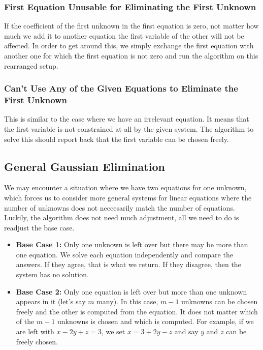\documentclass{article}
\begin{document}
	\subsubsection{First Equation Unusable for Eliminating the First Unknown}
	If the coefficient of the first unknown in the first equation is zero, not matter how much we add it to another equation the first variable of the other will not be affected. In order to get around this, we simply exchange the first equation with another one for which the first equation is not zero and run the algorithm on this rearranged setup.
	
	\subsubsection{Can't Use Any of the Given Equations to Eliminate the First Unknown}
	This is similar to the case where we have an irrelevant equation. It means that the first variable is not constrained at all by the given system. The algorithm to solve this should report back that the first variable can be chosen freely.
	
	\subsection{General Gaussian Elimination}
	We may encounter a situation where we have two equations for one unknown, which forces us to consider more general systems for linear equations where the number of unknowns does not neccesarily match the number of equations. Luckily, the algorithm does not need much adjustment, all we need to do is readjust the base case.
	
	\begin{itemize}
		\item \textbf{Base Case 1:} Only one unknown is left over but there may be more than one equation. We solve each equation independently and compare the answers. If they agree, that is what we return. If they disagree, then the system has no solution.
		\item \textbf{Base Case 2:} Only one equation is left over but more than one unknown appears in it (let's say $m$ many). In this case, $m - 1$ unknowns can be chosen freely and the other is computed from the equation. It does not matter which of the $m - 1$ unknowns is chosen and which is computed. For example, if we are left with $x - 2y + z = 3$, we set $x = 3 + 2y - z$ and say $y$ and $z$ can be freely chosen.
	\end{itemize}
	
\end{document}
